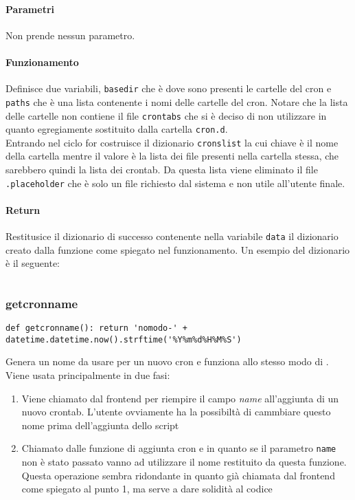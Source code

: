 \documentclass[11pt]{article}
\begin{document}
\paragraph{Parametri}
Non prende nessun parametro.
\paragraph{Funzionamento}
Definisce due variabili, \texttt{basedir} che è dove sono presenti le cartelle del cron e \texttt{paths} che è
una lista contenente i nomi delle cartelle del cron. Notare che la lista delle cartelle non contiene il file
\texttt{crontabs} che si è deciso di non utilizzare in quanto egregiamente sostituito dalla cartella \texttt{cron.d}.\\
Entrando nel ciclo for costruisce il dizionario \texttt{cronslist} la cui chiave è il nome della cartella mentre
il valore è la lista dei file presenti nella cartella stessa, che sarebbero quindi la lista dei crontab.
Da questa lista viene eliminato il file \texttt{.placeholder} che è solo un file richiesto dal sistema e non
utile all'utente finale.
\paragraph{Return}
Restitusice il dizionario di successo contenente nella variabile \texttt{data} il dizionario creato dalla funzione
come spiegato nel funzionamento. Un esempio del dizionario è il seguente:
\begin{lstlisting}
\end{lstlisting}

\subsubsection{getcronname}\label{getcronname}
\begin{lstlisting}
def getcronname(): return 'nomodo-' + datetime.datetime.now().strftime('%Y%m%d%H%M%S')
\end{lstlisting}
Genera un nome da usare per un nuovo cron e funziona allo stesso modo di .
Viene usata principalmente in due fasi:
\begin{enumerate}
	\item{Viene chiamato dal frontend per riempire il campo \textit{name} all'aggiunta di un nuovo crontab.
		L'utente ovviamente ha la possibiltà di cammbiare questo nome prima dell'aggiunta dello script}
	\item{Chiamato dalle funzione di aggiunta cron  e  in quanto
		se il parametro \texttt{name} non è stato passato vanno ad utilizzare il nome restituito da
		questa funzione. Questa operazione sembra ridondante in quanto già chiamata dal frontend come
		spiegato al punto 1, ma serve a dare solidità al codice}
\end{enumerate}
\end{document}
